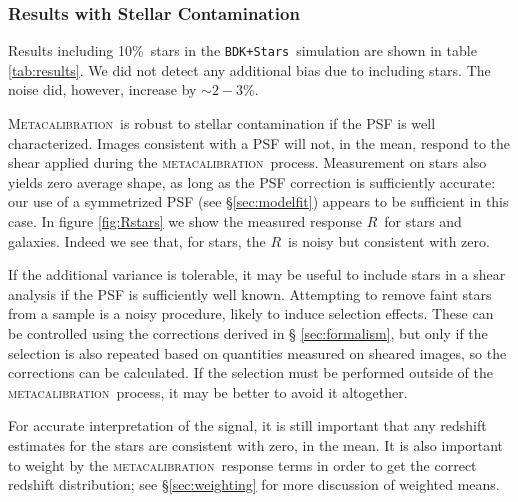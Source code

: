 \documentclass[iop]{emulateapj}
\newcommand{\mcal}{\textsc{metacalibration}}
\newcommand{\Mcal}{\textsc{Metacalibration}}
\newcommand{\mcalR}{\mbox{\boldmath $R$}}
\newcommand{\nsimNStar}{$5.6 \times 10^8$}
\newcommand{\nsimNstarperc}{10\%}
\newcommand{\starnoiseincrease}{$\sim 2-3$\%}
\newcommand{\bdsim}{\texttt{BDK}}
\newcommand{\bdstar}{\texttt{BDK+Stars}}
\begin{document}



\subsubsection{Results with Stellar Contamination} \label{sec:stars}

Results including \nsimNstarperc\ stars in the \bdstar\ simulation are shown in
table \ref{tab:results}. We did not detect any additional bias due to including
stars. The noise did, however, increase by \starnoiseincrease.


\Mcal\ is robust to stellar contamination if the PSF is well
characterized.  Images consistent with a PSF will not, in the mean, respond to the shear
applied during the \mcal\ process.  Measurement on stars also yields zero average shape, as
long as the PSF correction is sufficiently accurate: our use of a symmetrized
PSF (see \S \ref{sec:modelfit}) appears to be sufficient in this case.
In figure \ref{fig:Rstars} we show the measured response \mcalR\ for stars and
galaxies.  Indeed we see that, for stars, the \mcalR\ is noisy but consistent
with zero.

If the additional variance is tolerable, it may be useful to include stars in a
shear analysis if the PSF is sufficiently well known.  Attempting to remove
faint stars from a sample is a noisy procedure, likely to induce selection
effects.  These can be controlled using the corrections derived in \S
\ref{sec:formalism}, but only if the selection is also repeated based on
quantities measured on sheared images, so the corrections can be calculated.
If the selection must be performed outside of the \mcal\ process, it may be
better to avoid it altogether.

For accurate interpretation of the signal, it is still important that any
redshift estimates for the stars are consistent with zero, in the mean. It is
also important to weight by the \mcal\ response terms in order to get the
correct redshift distribution; see \S \ref{sec:weighting} for more
discussion of weighted means.
\end{document}
